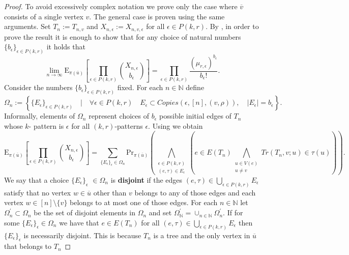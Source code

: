 \documentclass[12pt,notitlepage,a4paper]{article}
\theoremstyle{definition}
\newcommand{\N}{\mathbb{N}}
\newcommand{\Ln}{\lim\limits_{n\to \infty}}
\begin{document}
\begin{proof}
	To avoid excessively complex notation we prove only the case where
	$\overline{v}$ consists of a single vertex $v$. The general case is proven
	using the same arguments. Set $T_n:=T_{n,v}$ and 
	$X_{n,\epsilon}:=X_{n,v,\epsilon}$ for all $\epsilon\in P(k,r)$.
	By ,
	in order to prove the result it is enough to show that 
	for any choice of natural numbers $\{b_\epsilon\}_{\epsilon\in P(k,r)}$
	it holds that
	\begin{equation} \label{eqn:binomexpedges}
	\Ln
	\mathrm{E}_{\pi(\overline{u})}
	\left[
	\prod_{\epsilon\in P(k,r)} \binom{X_{n,\epsilon}}{b_\epsilon}	
	\right]
	= \prod_{\epsilon\in P(k,r)} \frac{(\mu_{r,\epsilon})^
		{b_\epsilon}}{b_\epsilon!}.	
	\end{equation}
	Consider the numbers $\{b_\epsilon\}_{\epsilon\in P(k,r)}$
	fixed. 
	For each $n\in \N$ define
	\[
	\Omega_n:=\left\{
	\{E_\epsilon\}_{\epsilon\in P(k,r)} \quad 
	\Big | \quad \forall \epsilon\in P(k,r) \quad
	E_\epsilon\subset Copies(\epsilon,[n],(v,\rho)), 
	\quad |E_\epsilon|=b_\epsilon	
	\right\}.		
	\]
	Informally, elements of $\Omega_n$ represent choices of 
	$b_\epsilon$ possible initial edges of $T_n$ whose $k$-
	pattern is $\epsilon$ for all $(k,r)$-patterns $\epsilon$. 	
	Using  we obtain
	\[
	\mathrm{E}_{\pi(\overline{u})}
	\left[
	\prod_{\epsilon\in P(k,r)} \binom{X_{n,\epsilon}}{b_\epsilon}	
	\right]
	= 
	\sum_{
		\{E_\epsilon\}_{\epsilon}
		\in \Omega_n}
	\mathrm{Pr}_{\pi(\overline{u})}\left(
	\bigwedge_{\substack{
			\epsilon\in P(k,r)\\
			(e, \tau)\in E_{\epsilon}
	}} \left(
	e\in E(T_n) \bigwedge_{\substack{
			u\in V(e)\\
			u\neq v}} Tr(T_n,v;u)\in \tau(u)		
	\right)
	\right). 		
	\]
	We say that a choice $\{E_\epsilon\}_{\epsilon}$
	$\in \Omega_n$ is \textbf{disjoint} if the edges
	$(e,\tau)\in\bigcup_{\epsilon\in P(k,r)} E_\epsilon$ satisfy
	that no vertex $w\in \overline{u}$ other than $v$ belongs to any
	of those edges and each vertex 
	$w\in [n]\setminus\{v\}$ belongs to at most one of those edges. 
	For each $n\in \N$ let $\Omega_n^\prime\subset \Omega_n$ 
	be the set	of disjoint elements in $\Omega_n$ and set
	$\Omega^\prime_\N= \cup_{n\in \N} \Omega^\prime_n$.
	If for some
	$\{E_\epsilon\}_\epsilon \in \Omega_n$ 
	we have that $e\in E(T_n)$ for all $(e,\tau)\in
	\bigcup_{\epsilon\in P(k,r)} E_\epsilon$ 
	then $\{E_\epsilon\}_\epsilon$ 
	is necessarily disjoint. 
	This is because $T_n$ is a tree and
	the only vertex in  $\overline{u}$ that belongs to $T_n$ 

\end{proof}
\end{document}
